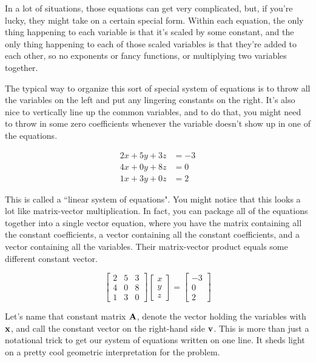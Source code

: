 In a lot of situations, those equations can get very complicated, but, if you're
lucky, they might take on a certain special form. Within each equation, the only
thing happening to each variable is that it's scaled by some constant, and the
only thing happening to each of those scaled variables is that they're added to
each other, so no exponents or fancy functions, or multiplying two variables
together.

The typical way to organize this sort of special system of equations is to throw
all the variables on the left and put any lingering constants on the right. It's
also nice to vertically line up the common variables, and to do that, you might
need to throw in some zero coefficients whenever the variable doesn't show up in
one of the equations.

\begin{align*}
  2x + 5y + 3z &= -3 \\
  4x + 0y + 8z &= 0 \\
  1x + 3y + 0z &= 2
\end{align*}

This is called a ``linear system of equations". You might notice that this looks
a lot like matrix-vector multiplication. In fact, you can package all of the
equations together into a single vector equation, where you have the matrix
containing all the constant coefficients, a vector containing all the constant
coefficients, and a vector containing all the variables. Their matrix-vector
product equals some different constant vector.

\begin{equation*}
  \begin{bmatrix}
    2 & 5 & 3 \\
    4 & 0 & 8 \\
    1 & 3 & 0
  \end{bmatrix}
  \begin{bmatrix}
    x \\
    y \\
    z
  \end{bmatrix} =
  \begin{bmatrix}
    -3 \\
    0 \\
    2
  \end{bmatrix}
\end{equation*}

Let's name that constant matrix $\mathbf{A}$, denote the vector holding the
variables with $\mathbf{x}$, and call the constant vector on the right-hand side
$\mathbf{v}$. This is more than just a notational trick to get our system of
equations written on one line. It sheds light on a pretty cool geometric
interpretation for the problem.

